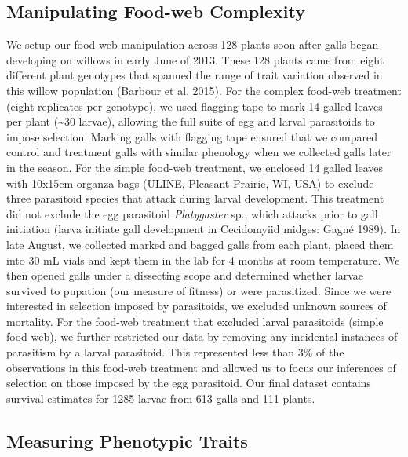 \documentclass[11pt,]{article}
\begin{document}
\subsection{Manipulating Food-web
Complexity}\label{manipulating-food-web-complexity}

We setup our food-web manipulation across 128 plants soon after galls
began developing on willows in early June of 2013. These 128 plants came
from eight different plant genotypes that spanned the range of trait
variation observed in this willow population (Barbour et al. 2015). For
the complex food-web treatment (eight replicates per genotype), we used
flagging tape to mark 14 galled leaves per plant (\textasciitilde{}30
larvae), allowing the full suite of egg and larval parasitoids to impose
selection. Marking galls with flagging tape ensured that we compared
control and treatment galls with similar phenology when we collected
galls later in the season. For the simple food-web treatment, we
enclosed 14 galled leaves with 10x15cm organza bags (ULINE, Pleasant
Prairie, WI, USA) to exclude three parasitoid species that attack during
larval development. This treatment did not exclude the egg parasitoid
\emph{Platygaster} sp., which attacks prior to gall initiation (larva
initiate gall development in Cecidomyiid midges: Gagné 1989). In late
August, we collected marked and bagged galls from each plant, placed
them into 30 mL vials and kept them in the lab for 4 months at room
temperature. We then opened galls under a dissecting scope and
determined whether larvae survived to pupation (our measure of fitness)
or were parasitized. Since we were interested in selection imposed by
parasitoids, we excluded unknown sources of mortality. For the food-web
treatment that excluded larval parasitoids (simple food web), we further
restricted our data by removing any incidental instances of parasitism
by a larval parasitoid. This represented less than 3\% of the
observations in this food-web treatment and allowed us to focus our
inferences of selection on those imposed by the egg parasitoid. Our
final dataset contains survival estimates for 1285 larvae from 613 galls
and 111 plants.

\subsection{Measuring Phenotypic
Traits}\label{measuring-phenotypic-traits}
\end{document}

